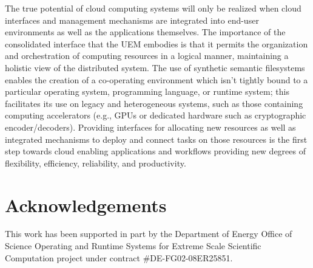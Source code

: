 \documentclass{sig-alternate}
\begin{document}
The true potential of cloud computing systems will only
be realized when cloud interfaces and management mechanisms 
are integrated into end-user environments as well as the applications
themselves.
The importance of the consolidated interface that the UEM embodies is that it 
permits the organization and orchestration of computing resources in a logical
manner, maintaining a holistic view of the distributed system.
The use of synthetic semantic filesystems enables the creation of a
co-operating environment which isn't tightly bound to a particular 
operating system, programming language, or runtime system; this facilitates its use on legacy
and heterogeneous systems, such as those containing computing accelerators
(e.g., GPUs or dedicated hardware such as cryptographic encoder/decoders).
Providing interfaces for allocating new resources as well as integrated mechanisms 
to deploy and connect tasks on those resources is the first step towards cloud 
enabling applications and workflows providing new degrees of flexibility, efficiency,
reliability, and productivity.

\section{Acknowledgements}

This work has been supported in part by the Department of Energy Office of
Science Operating and Runtime Systems for Extreme Scale Scientific
Computation project under contract \#DE-FG02-08ER25851.

%

\end{document}
